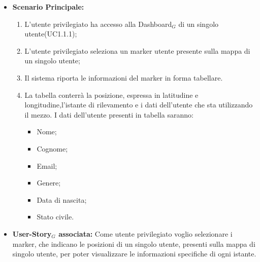 \documentclass[11pt]{article}
\begin{document}
\begin{justify}
\begin{itemize}
      \item \textbf{Scenario Principale:}
        \begin{enumerate}
            \item L'utente privilegiato ha accesso alla Dashboard$_G$ di un singolo utente(UC1.1.1);
            \item L'utente privilegiato seleziona un marker utente presente sulla mappa di un singolo utente;
            \item Il sistema riporta le informazioni del marker in forma tabellare.
            \item La tabella conterrà la posizione, espressa in latitudine e longitudine,l'istante di rilevamento e i dati dell'utente che sta utilizzando il mezzo. I dati dell'utente presenti in tabella saranno:
              \begin{itemize}
              \item Nome;
              \item Cognome;
              \item Email;
              \item Genere;
              \item Data di nascita;
              \item Stato civile.
              \end{itemize}
        \end{enumerate}
     \item \textbf{User-Story$_G$ associata:}
       Come utente privilegiato voglio selezionare i marker, che indicano le posizioni di un singolo utente, presenti sulla mappa di singolo utente, per poter visualizzare le informazioni specifiche di ogni istante.
\end{itemize}


\end{justify}
\end{document}
